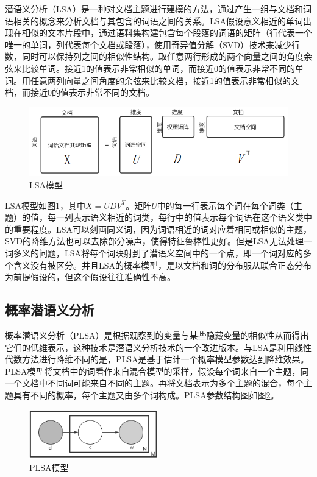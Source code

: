\documentclass[winfonts,master,oneside,nobackinfo]{njuthesis}
\begin{document}
潜语义分析（LSA）是一种对文档主题进行建模的方法，通过产生一组与文档和词语相关的概念来分析文档与其包含的词语之间的关系。LSA假设意义相近的单词出现在相似的文本片段中，通过语料集构建包含每个段落的词语的矩阵（行代表一个唯一的单词，列代表每个文档或段落），使用奇异值分解（SVD）技术来减少行数，同时可以保持列之间的相似性结构。取任意两行形成的两个向量之间的角度余弦来比较单词。接近1的值表示非常相似的单词，而接近0的值表示非常不同的单词。用任意两列向量之间角度的余弦来比较文档，接近1的值表示非常相似的文档，而接近0的值表示非常不同的文档。

\begin{figure}[h]
\centering
\includegraphics[width=1\textwidth]{./figure/LSA.jpg}
\caption{LSA模型}
\label{lsa}
\end{figure}


LSA模型如图\ref{lsa}，其中$X = U D V ^ { T }$。矩阵$U$中的每一行表示每个词在每个词类（主题）的值，每一列表示语义相近的词类，每行中的值表示每个词语在这个语义类中的重要程度。LSA可以刻画同义词，因为词语相近的词对应着相同或相似的主题，SVD的降维方法也可以去除部分噪声，使得特征鲁棒性更好。但是LSA无法处理一词多义的问题，LSA将每个词映射到了潜语义空间中的一个点，即一个词对应的多个含义没有被区分。并且LSA的概率模型，是以文档和词的分布服从联合正态分布为前提假设的，但这个假设往往准确性不高。

\subsection{概率潜语义分析}

概率潜语义分析（PLSA）是根据观察到的变量与某些隐藏变量的相似性从而得出它们的低维表示，这种技术是潜语义分析技术的一个改进版本。与LSA是利用线性代数方法进行降维不同的是，PLSA是基于估计一个概率模型参数达到降维效果。PLSA模型将文档中的词看作来自混合模型的采样，假设每个词来自一个主题，同一个文档中不同词可能来自不同的主题。再将文档表示为多个主题的混合，每个主题具有不同的概率，每个主题又由多个词构成。PLSA参数结构图如图\ref{plsa}。

\begin{figure}[h]
\centering
\includegraphics[width=0.5\textwidth]{./figure/PLSA.jpg}
\caption{PLSA模型}
\label{plsa}
\end{figure}
\end{document}
